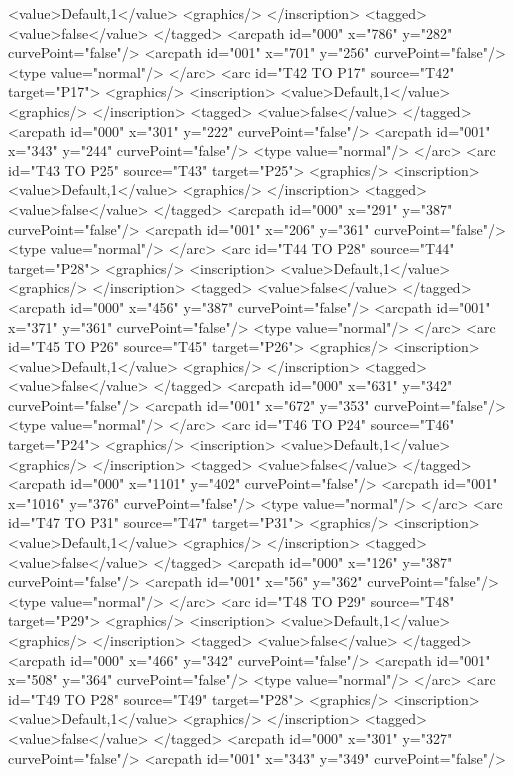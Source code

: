 <value>Default,1</value>
<graphics/>
</inscription>
<tagged>
<value>false</value>
</tagged>
<arcpath id="000" x="786" y="282" curvePoint="false"/>
<arcpath id="001" x="701" y="256" curvePoint="false"/>
<type value="normal"/>
</arc>
<arc id="T42 TO P17" source="T42" target="P17">
<graphics/>
<inscription>
<value>Default,1</value>
<graphics/>
</inscription>
<tagged>
<value>false</value>
</tagged>
<arcpath id="000" x="301" y="222" curvePoint="false"/>
<arcpath id="001" x="343" y="244" curvePoint="false"/>
<type value="normal"/>
</arc>
<arc id="T43 TO P25" source="T43" target="P25">
<graphics/>
<inscription>
<value>Default,1</value>
<graphics/>
</inscription>
<tagged>
<value>false</value>
</tagged>
<arcpath id="000" x="291" y="387" curvePoint="false"/>
<arcpath id="001" x="206" y="361" curvePoint="false"/>
<type value="normal"/>
</arc>
<arc id="T44 TO P28" source="T44" target="P28">
<graphics/>
<inscription>
<value>Default,1</value>
<graphics/>
</inscription>
<tagged>
<value>false</value>
</tagged>
<arcpath id="000" x="456" y="387" curvePoint="false"/>
<arcpath id="001" x="371" y="361" curvePoint="false"/>
<type value="normal"/>
</arc>
<arc id="T45 TO P26" source="T45" target="P26">
<graphics/>
<inscription>
<value>Default,1</value>
<graphics/>
</inscription>
<tagged>
<value>false</value>
</tagged>
<arcpath id="000" x="631" y="342" curvePoint="false"/>
<arcpath id="001" x="672" y="353" curvePoint="false"/>
<type value="normal"/>
</arc>
<arc id="T46 TO P24" source="T46" target="P24">
<graphics/>
<inscription>
<value>Default,1</value>
<graphics/>
</inscription>
<tagged>
<value>false</value>
</tagged>
<arcpath id="000" x="1101" y="402" curvePoint="false"/>
<arcpath id="001" x="1016" y="376" curvePoint="false"/>
<type value="normal"/>
</arc>
<arc id="T47 TO P31" source="T47" target="P31">
<graphics/>
<inscription>
<value>Default,1</value>
<graphics/>
</inscription>
<tagged>
<value>false</value>
</tagged>
<arcpath id="000" x="126" y="387" curvePoint="false"/>
<arcpath id="001" x="56" y="362" curvePoint="false"/>
<type value="normal"/>
</arc>
<arc id="T48 TO P29" source="T48" target="P29">
<graphics/>
<inscription>
<value>Default,1</value>
<graphics/>
</inscription>
<tagged>
<value>false</value>
</tagged>
<arcpath id="000" x="466" y="342" curvePoint="false"/>
<arcpath id="001" x="508" y="364" curvePoint="false"/>
<type value="normal"/>
</arc>
<arc id="T49 TO P28" source="T49" target="P28">
<graphics/>
<inscription>
<value>Default,1</value>
<graphics/>
</inscription>
<tagged>
<value>false</value>
</tagged>
<arcpath id="000" x="301" y="327" curvePoint="false"/>
<arcpath id="001" x="343" y="349" curvePoint="false"/>
